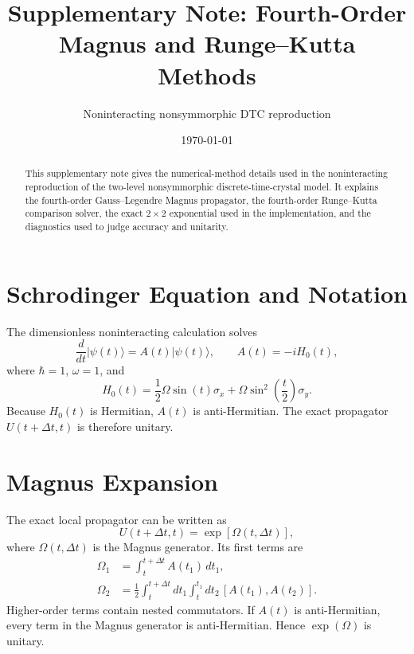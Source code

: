 \documentclass[11pt,a4paper]{article}
\title{Supplementary Note: Fourth-Order Magnus and Runge--Kutta Methods}
\author{Noninteracting nonsymmorphic DTC reproduction}
\date{\today}
\begin{document}
\maketitle

\begin{abstract}
This supplementary note gives the numerical-method details used in the noninteracting reproduction of the two-level nonsymmorphic discrete-time-crystal model. It explains the fourth-order Gauss--Legendre Magnus propagator, the fourth-order Runge--Kutta comparison solver, the exact \(2\times2\) exponential used in the implementation, and the diagnostics used to judge accuracy and unitarity.
\end{abstract}

\section{Schrodinger Equation and Notation}

The dimensionless noninteracting calculation solves
\begin{equation}
\frac{d}{dt}|\psi(t)\rangle = A(t)|\psi(t)\rangle,
\qquad
A(t)=-iH_0(t),
\end{equation}
where \(\hbar=1\), \(\omega=1\), and
\begin{equation}
H_0(t)
=\frac{1}{2}\Omega\sin(t)\sigma_x
 +\Omega\sin^2\left(\frac{t}{2}\right)\sigma_y.
\end{equation}
Because \(H_0(t)\) is Hermitian, \(A(t)\) is anti-Hermitian. The exact propagator \(U(t+\Delta t,t)\) is therefore unitary.

\section{Magnus Expansion}

The exact local propagator can be written as
\begin{equation}
U(t+\Delta t,t)=\exp[\Omega(t,\Delta t)],
\end{equation}
where \(\Omega(t,\Delta t)\) is the Magnus generator. Its first terms are
\begin{align}
\Omega_1 &= \int_t^{t+\Delta t} A(t_1)\,dt_1,\\
\Omega_2 &= \frac{1}{2}\int_t^{t+\Delta t}dt_1
\int_t^{t_1}dt_2\,[A(t_1),A(t_2)].
\end{align}
Higher-order terms contain nested commutators. If \(A(t)\) is anti-Hermitian, every term in the Magnus generator is anti-Hermitian. Hence \(\exp(\Omega)\) is unitary.
\end{document}
